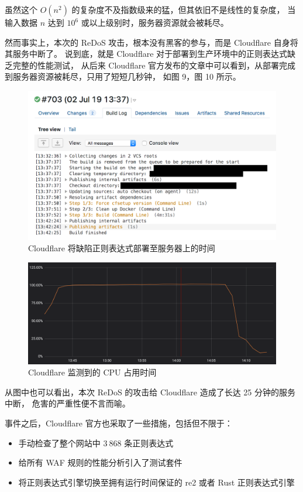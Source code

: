 \documentclass[hyperref,UTF8,12pt,a4paper]{ctexart}
\begin{document}
虽然这个 $O(n^2)$ 的复杂度不及指数级来的猛，但其依旧不是线性的复杂度，
当输入数据 $n$ 达到 $10^6$ 或以上级别时，服务器资源就会被耗尽。

然而事实上，本次的 ReDoS 攻击，根本没有黑客的参与，而是 Cloudflare 自身将其服务中断了。
说到底，就是 Cloudflare 对于部署到生产环境中的正则表达式缺乏完整的性能测试，
从后来 Cloudflare 官方发布的文章中可以看到，从部署完成到服务器资源被耗尽，只用了短短几秒钟，
如图 9，图 10 所示。

\begin{figure}[h]
	\centering
	\includegraphics[width=13cm]{figures/cloudflare-deploy.png}
	\caption{Cloudflare 将缺陷正则表达式部署至服务器上的时间}
\end{figure}

\begin{figure}[h]
	\centering
	\includegraphics[width=13cm]{figures/cloudflare-boom.png}
	\caption{Cloudflare 监测到的 CPU 占用时间}
\end{figure}

从图中也可以看出，本次 ReDoS 的攻击给 Cloudflare 造成了长达 25 分钟的服务中断，
危害的严重性便不言而喻。

事件之后，Cloudflare 官方也采取了一些措施，包括但不限于：

\begin{itemize}
	\item 手动检查了整个网站中 $3\ 868$ 条正则表达式
	\item 给所有 WAF 规则的性能分析引入了测试套件
	\item 将正则表达式引擎切换至拥有运行时间保证的 re2 或者 Rust 正则表达式引擎
\end{itemize}
\end{document}
